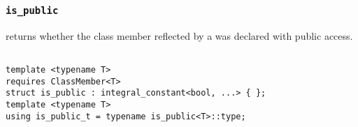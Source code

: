 
\subsubsection{\texttt{is\_public}}

returns whether the class member reflected by a  was declared with public access.

\begin{verbatim}

template <typename T>
requires ClassMember<T>
struct is_public : integral_constant<bool, ...> { };
template <typename T>
using is_public_t = typename is_public<T>::type;

\end{verbatim}
